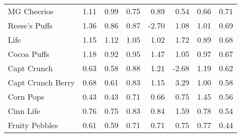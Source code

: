 \documentclass[xcolor=pdftex,dvipsnames,table,mathserif,aspectratio=169]{beamer}
\begin{document}
\begin{frame}[plain]
\begin{center}
{\begin{tabular}{lrrrrrrr}
MG Cheerios         &      1.11 &       0.99 &         0.75 &           0.89 &         0.54 &         0.66 &    0.71 \\
Reese's Puffs       &      1.36 &       0.86 &         0.87 &          -2.70 &         1.08 &         1.01 &    0.69 \\
Life                &      1.15 &       1.12 &         1.05 &           1.02 &         1.72 &         0.89 &    0.68 \\
Cocoa Puffs         &      1.18 &       0.92 &         0.95 &           1.47 &         1.05 &         0.97 &    0.67 \\
Capt Crunch         &      0.63 &       0.58 &         0.88 &           1.21 &        -2.68 &         1.19 &    0.62 \\
Capt Crunch Berry   &      0.68 &       0.61 &         0.83 &           1.15 &         3.29 &         1.00 &    0.58 \\
Corn Pops           &      0.43 &       0.43 &         0.71 &           0.66 &         0.75 &         1.45 &    0.56 \\
Cinn Life           &      0.76 &       0.75 &         0.83 &           0.84 &         1.59 &         0.78 &    0.54 \\
Fruity Pebbles      &      0.61 &       0.59 &         0.71 &           0.71 &         0.75 &         0.77 &    0.44 \\
\bottomrule
\end{tabular}

}
\end{center}
\end{frame}





\end{document}
